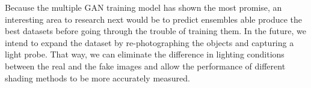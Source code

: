 \documentclass[10pt,twocolumn,letterpaper]{article}
\begin{document}
Because the multiple GAN training model has shown the most promise, an interesting area to research next would be to predict ensembles able produce the best datasets before going through the trouble of training them.
In the future, we intend to expand the dataset by re-photographing the objects and capturing a light probe.  That way, we can eliminate the difference in lighting conditions between the real and the fake images and allow the performance of different shading methods to be more accurately measured.

\end{document}
